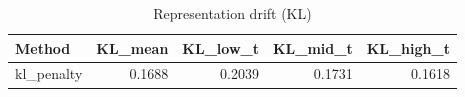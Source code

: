 \begin{table}[htbp]
\centering
\caption{Representation drift (KL)}
\label{tab:repr-drift}
\begin{tabular}{lrrrr}
\toprule
\textbf{Method} & \textbf{KL\_mean} & \textbf{KL\_low\_t} & \textbf{KL\_mid\_t} & \textbf{KL\_high\_t} \\
\midrule
kl\_penalty & 0.1688 & 0.2039 & 0.1731 & 0.1618 \\
\bottomrule
\end{tabular}
\end{table}